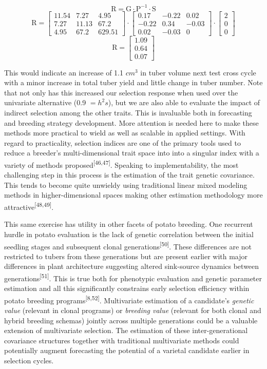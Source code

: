 \[ \mathrm {R = G \cdot P^{-1} \cdot S}\]
\[ \mathrm {R} = \begin{bmatrix}11.54 & 7.27 & 4.95 \\ 7.27 & 11.13 & 67.2 \\ 4.95 & 67.2 & 629.51\end{bmatrix}\cdot\begin{bmatrix}0.17 & -0.22 & 0.02 \\ -0.22 & 0.34 & -0.03 \\ 0.02 & -0.03 & 0\end{bmatrix} \cdot \begin{bmatrix} 2 \\ 0 \\ 0 \end{bmatrix} \]
\[\mathrm {R} = \begin{bmatrix}1.09 \\ 0.64 \\ 0.07\end{bmatrix}\]

This would indicate an increase of 1.1 \(cm^3\) in tuber volume next
test cross cycle with a minor increase in total tuber yield and little
change in tuber number. Note that not only has this increased our
selection response when used over the univariate alternative (0.9
\(= h^2 s\)), but we are also able to evaluate the impact of indirect
selection among the other traits. This is invaluable both in
forecasting and breeding strategy development. More attention is needed
here to make these methods more practical to wield as well as scalable
in applied settings. With regard to practicality, selection indices are
one of the primary tools used to reduce a breeder's multi-dimensional
trait space into into a singular index with a variety of methods
proposed\textsuperscript{{[}46,47{]}}. Speaking to implementability, the
most challenging step in this process is the estimation of the trait
genetic covariance. This tends to become quite unwieldy using
traditional linear mixed modeling methods in higher-dimensional spaces
making other estimation methodology more
attractive\textsuperscript{{[}48,49{]}}.

This same exercise has utility in other facets of potato breeding. One
recurrent hurdle in potato evaluation is the lack of genetic correlation
between the initial seedling stages and subsequent clonal
generations\textsuperscript{{[}50{]}}. These differences are not
restricted to tubers from these generations but are present earlier with
major differences in plant architecture suggesting altered sink-source
dynamics between generations\textsuperscript{{[}51{]}}. This is true
both for phenotypic evaluation and genetic parameter estimation and all
this significantly constrains early selection efficiency within potato
breeding programs\textsuperscript{{[}8,52{]}}. Multivariate estimation
of a candidate's \emph{genetic value} (relevant in clonal programs) or
\emph{breeding value} (relevant for both clonal and hybrid breeding
schemas) jointly across multiple generations could be a valuable
extension of multivariate selection. The estimation of these
inter-generational covariance structures together with 
traditional multivariate methods could potentially augment forecasting
the potential of a varietal candidate earlier in selection cycles.

